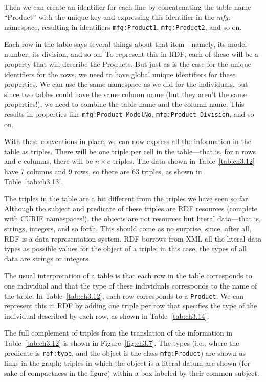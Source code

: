\begin{challenge}
Then we can create an identifier for each line by concatenating the
table name ``Product'' with the unique key and expressing this
identifier in the \emph{mfg:} namespace, resulting in identifiers \texttt{mfg:Product1},
\texttt{mfg:Product2}, and so on.

Each row in the table says several things about that item---namely, its
model number, its division, and so on. To represent this in RDF, each of these will be a property that will
describe the Products. But just as is the case for the unique
identifiers for the rows, we need to have global unique identifiers for
these properties. We can use the same namespace as we did for the
individuals, but since two tables could have the same column name (but
they aren't the same properties!), we need to combine the table name and
the column name. This results in properties like \texttt{mfg:Product\_ModelNo},
\texttt{mfg:Product\_Division}, and so on.

With these conventions in place, we can now express all the information
in the table as triples. There will be one triple per cell in the
table---that is, for n rows and c columns, there will be $n \times c$ triples.
The data shown in Table~\ref{tab:ch3.12} have 7 columns and 9 rows, so there are 63
triples, as shown in Table~\ref{tab:ch3.13}.

The triples in the table are a bit different from the triples we have
seen so far. Although the subject and  
predicate of these triples are RDF resources (complete with CURIE
namespaces!), the objects are not resources but literal data---that is,
strings, integers, and so forth. This should come as no surprise, since,
after all, RDF is a data representation system. RDF borrows from XML all
the literal data types as possible values for the object of a triple; in
this case, the types of all data are strings or integers.

The usual interpretation of a table is that each row in the table
corresponds to one individual and that the type of these individuals
corresponds to the name of the table. In Table~\ref{tab:ch3.12}, each row
corresponds to a \texttt{Product}. We can represent this in RDF by adding one
triple per row that specifies the type of the individual described by
each row, as shown in Table~\ref{tab:ch3.14}.

The full complement of triples from the translation of the information
in Table~\ref{tab:ch3.12} is shown in Figure~\ref{fig:ch3.7}. The types (i.e., where the
predicate is \texttt{rdf:type}, and the object is the class \texttt{mfg:Product}) are
shown as links in the graph; triples in which the object is a literal
datum are shown (for sake of compactness in the figure) within a box
labeled by their common subject.


\end{challenge}
